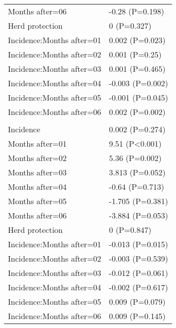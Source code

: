 \documentclass[]{article}
\begin{document}
\begin{longtable}[t]{ll}
\hspace{1em}Months after=06 & -0.28 (P=0.198)\\
\hspace{1em}Herd protection & 0 (P=0.327)\\
\hspace{1em}Incidence:Months after=01 & 0.002 (P=0.023)\\
\hspace{1em}Incidence:Months after=02 & 0.001 (P=0.25)\\
\hspace{1em}Incidence:Months after=03 & 0.001 (P=0.465)\\
\hspace{1em}Incidence:Months after=04 & -0.003 (P=0.002)\\
\hspace{1em}Incidence:Months after=05 & -0.001 (P=0.045)\\
\hspace{1em}Incidence:Months after=06 & 0.002 (P=0.002)\\
\addlinespace[1.5em]
\multicolumn{2}{l}{\textbf{Temporary not field worker}}\\
\hspace{1em}Incidence & 0.002 (P=0.274)\\
\hspace{1em}Months after=01 & 9.51 (P<0.001)\\
\hspace{1em}Months after=02 & 5.36 (P=0.002)\\
\hspace{1em}Months after=03 & 3.813 (P=0.052)\\
\hspace{1em}Months after=04 & -0.64 (P=0.713)\\
\hspace{1em}Months after=05 & -1.705 (P=0.381)\\
\hspace{1em}Months after=06 & -3.884 (P=0.053)\\
\hspace{1em}Herd protection & 0 (P=0.847)\\
\hspace{1em}Incidence:Months after=01 & -0.013 (P=0.015)\\
\hspace{1em}Incidence:Months after=02 & -0.003 (P=0.539)\\
\hspace{1em}Incidence:Months after=03 & -0.012 (P=0.061)\\
\hspace{1em}Incidence:Months after=04 & -0.002 (P=0.617)\\
\hspace{1em}Incidence:Months after=05 & 0.009 (P=0.079)\\
\hspace{1em}Incidence:Months after=06 & 0.009 (P=0.145)\\*
\end{longtable}
\end{document}
